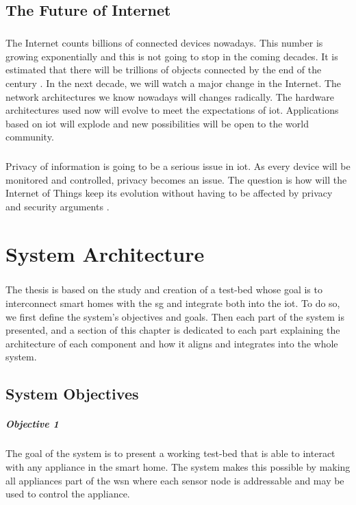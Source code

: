 \documentclass[oneside,12pt,a4paper,final]{book}
\begin{document}
\section{The Future of Internet}
\paragraph{}
The Internet counts billions of connected devices nowadays. This number is growing exponentially and this is not going to stop in the coming decades. It is estimated that there will be trillions of objects connected by the end of the century \cite{ref3}. In the next decade, we will watch a major change in the Internet. The network architectures we know nowadays will changes radically. The hardware architectures used now will evolve to meet the expectations of \gls{iot}. Applications based on \gls{iot} will explode and new possibilities will be open to the world community.
\paragraph{}
Privacy of information is going to be a serious issue in \gls{iot}. As every device will be monitored and controlled, privacy becomes an issue. The question is how will the Internet of Things keep its evolution without having to be affected by privacy and security arguments \cite{ref20}.

\chapter{System Architecture}
\paragraph{}
The thesis is based on the study and creation of a test-bed whose goal is to interconnect smart homes with the \gls{sg} and integrate both into the \gls{iot}. To do so, we first define the system's objectives and goals. Then each part of the system is presented, and a section of this chapter is dedicated to each part explaining the architecture of each component and how it aligns and integrates into the whole system.
\section{System Objectives}
\paragraph{Objective 1}
The goal of the system is to present a working test-bed that is able to interact with any appliance in the smart home. The system makes this possible by making all appliances part of the \gls{wsn} where each sensor node is addressable and may be used to control the appliance.
\end{document}
